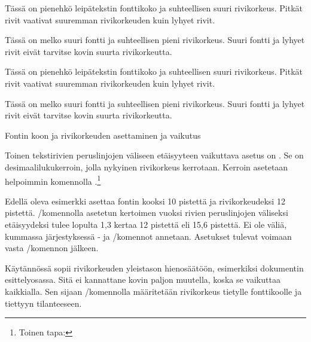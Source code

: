 \begin{esimerkki*}
\begin{koodilohko}
  \fontsize{8bp}{11bp}\selectfont Tässä on pienehkö leipätekstin
  fonttikoko ja suhteellisen suuri rivikorkeus. Pitkät rivit vaativat
  suuremman rivikorkeuden kuin lyhyet rivit.

  \fontsize{16bp}{17bp}\selectfont Tässä on melko suuri fontti ja
  suhteellisen pieni rivikorkeus. Suuri fontti ja lyhyet rivit eivät
  tarvitse kovin suurta rivikorkeutta.
\end{koodilohko}
\parbox{\linewidth}{%
  \linespread{1}\erikoisfontti
  \fontsize{8bp}{11bp}\selectfont Tässä on pienehkö leipätekstin
  fonttikoko ja suhteellisen suuri rivikorkeus. Pitkät rivit vaativat
  suuremman rivikorkeuden kuin lyhyet rivit.

  \fontsize{16bp}{17bp}\selectfont Tässä on melko suuri fontti ja
  suhteellisen pieni rivikorkeus. Suuri fontti ja lyhyet rivit eivät
  tarvitse kovin suurta rivikorkeutta. }

\vspace{1ex}
\hrulefill
\vspace{2ex}

\caption{Fontin koon ja rivikorkeuden asettaminen ja vaikutus}
\label{esim:rivikorkeus}
\end{esimerkki*}

Toinen tekstirivien peruslinjojen väliseen etäisyyteen vaikuttava asetus
on . Se on desimaalilukukerroin, jolla
nykyinen rivikorkeus kerrotaan. Kerroin asetetaan helpoimmin komennolla
.\footnote{Toinen tapa: }

\begin{koodilohkosis}
  \fontsize{10bp}{12bp} \linespread{1.3} \selectfont
\end{koodilohkosis}

Edellä oleva esimerkki asettaa fontin kooksi 10 pistettä ja
rivikorkeudeksi 12 pistettä. \-/komennolla
asetetun kertoimen vuoksi rivien peruslinjojen väliseksi etäisyydeksi
tulee lopulta 1,3 kertaa 12 pistettä eli 15,6 pistettä. Ei ole väliä,
kummassa järjestyksessä - ja \-/komennot annetaan. Asetukset tulevat voimaan vasta
\-/komennon jälkeen.

Käytännössä  sopii rivikorkeuden yleistason
hienosäätöön, esimerkiksi dokumentin esittelyosassa. Sitä ei kannattane
kovin paljon muutella, koska se vaikuttaa kaikkialla. Sen sijaan
\-/komennolla määritetään rivikorkeus tietylle
fonttikoolle ja tiettyyn tilanteeseen.

